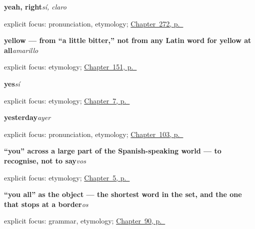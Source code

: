 \noindent\begin{minipage}[t]{\linewidth}
\raggedright
\textbf{yeah, right}\enspace\emph{sí, claro}\par
\footnotesize explicit focus: pronunciation, etymology; \hyperref[ch:entrelineas]{Chapter~272, p.~\pageref*{ch:entrelineas}}
\end{minipage}\par\smallskip

\noindent\begin{minipage}[t]{\linewidth}
\raggedright
\textbf{yellow — from \textquotedblleft{}a little bitter,\textquotedblright{} not from any Latin word for yellow at all}\enspace\emph{amarillo}\par
\footnotesize explicit focus: etymology; \hyperref[ch:spanish-green-and-yellow]{Chapter~151, p.~\pageref*{ch:spanish-green-and-yellow}}
\end{minipage}\par\smallskip

\noindent\begin{minipage}[t]{\linewidth}
\raggedright
\textbf{yes}\enspace\emph{sí}\par
\footnotesize explicit focus: etymology; \hyperref[ch:thank-you]{Chapter~7, p.~\pageref*{ch:thank-you}}
\end{minipage}\par\smallskip

\noindent\begin{minipage}[t]{\linewidth}
\raggedright
\textbf{yesterday}\enspace\emph{ayer}\par
\footnotesize explicit focus: pronunciation, etymology; \hyperref[ch:preterite]{Chapter~103, p.~\pageref*{ch:preterite}}
\end{minipage}\par\smallskip

\noindent\begin{minipage}[t]{\linewidth}
\raggedright
\textbf{\textquotedblleft{}you\textquotedblright{} across a large part of the Spanish-speaking world — to recognise, not to say}\enspace\emph{vos}\par
\footnotesize explicit focus: etymology; \hyperref[ch:three-yous]{Chapter~5, p.~\pageref*{ch:three-yous}}
\end{minipage}\par\smallskip

\noindent\begin{minipage}[t]{\linewidth}
\raggedright
\textbf{\textquotedblleft{}you all\textquotedblright{} as the object — the shortest word in the set, and the one that stops at a border}\enspace\emph{os}\par
\footnotesize explicit focus: grammar, etymology; \hyperref[ch:pronoun-os]{Chapter~90, p.~\pageref*{ch:pronoun-os}}
\end{minipage}\par\smallskip

